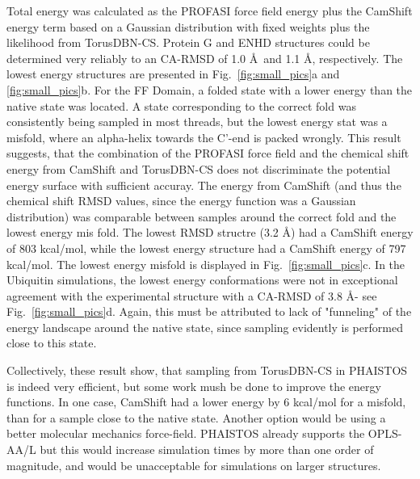 Total energy was calculated as the PROFASI force field energy plus the CamShift energy term based on a Gaussian distribution with fixed weights plus the likelihood from TorusDBN-CS.
Protein G and ENHD structures could be determined very reliably to an CA-RMSD of 1.0 \AA~and 1.1 \AA, respectively. The lowest energy structures are presented in Fig.~\ref{fig:small_pics}a and \ref{fig:small_pics}b.
For the FF Domain, a folded state with a lower energy than the native state was located.
A state corresponding to the correct fold was consistently being sampled in most threads, but the lowest energy stat was a misfold, where an alpha-helix towards the C'-end is packed wrongly.
This result suggests, that the combination of the PROFASI force field and the chemical shift energy from CamShift and TorusDBN-CS does not discriminate the potential energy surface with sufficient accuray. The energy from CamShift (and thus the chemical shift RMSD values, since the energy function was a Gaussian distribution) was comparable between samples around the correct fold and the lowest energy mis fold. The lowest RMSD structre (3.2 \AA) had a CamShift energy of 803 kcal/mol, while the lowest energy structure had a CamShift energy of 797 kcal/mol.
The lowest energy misfold is displayed in Fig.~\ref{fig:small_pics}c.
In the Ubiquitin simulations, the lowest energy conformations were not in exceptional agreement with the experimental structure with a CA-RMSD of 3.8 \AA - see Fig.~\ref{fig:small_pics}d.
 Again, this must be attributed to lack of "funneling" of the energy landscape around the native state, since sampling evidently is performed close to this state.

Collectively, these result show, that sampling from TorusDBN-CS in PHAISTOS is indeed very efficient, but some work mush be done to improve the energy functions. In one case, CamShift had a lower energy by 6 kcal/mol for a misfold, than for a sample close to the native state.
Another option would be using a better molecular mechanics force-field. PHAISTOS already supports the OPLS-AA/L but this would increase simulation times by more than one order of magnitude, and would be unacceptable for simulations on larger structures.

